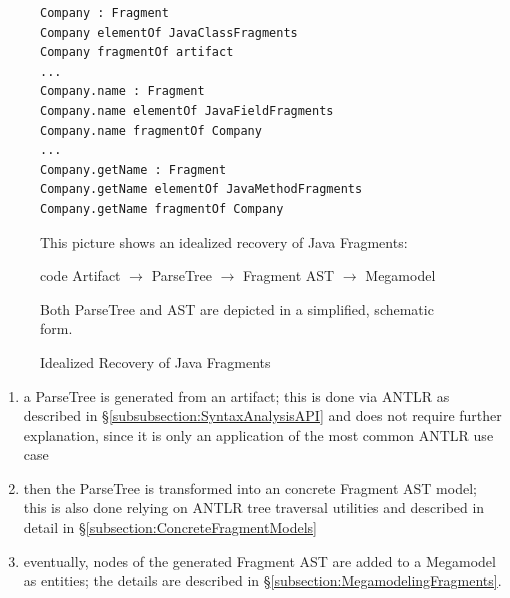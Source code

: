 \begin{figure}[h!]
\begin{center}
\begin{minipage}{0.5\textwidth}
\begin{lstlisting}[numbers=none]
Company : Fragment
Company elementOf JavaClassFragments
Company fragmentOf artifact
...
Company.name : Fragment
Company.name elementOf JavaFieldFragments
Company.name fragmentOf Company
...
Company.getName : Fragment
Company.getName elementOf JavaMethodFragments
Company.getName fragmentOf Company
\end{lstlisting}
\end{minipage}
\end{center}
{
\scriptsize
This picture shows an idealized recovery of \gls{Java} \glspl{Fragment}:
\begin{center}
code \gls{Artifact}
$\rightarrow$
\gls{ParseTree}
$\rightarrow$
\gls{Fragment} \gls{AST}
$\rightarrow$
\gls{Megamodel}
\end{center} 
Both \gls{ParseTree} and \gls{AST} are depicted in a simplified, schematic form.
}
\caption{Idealized Recovery of Java Fragments}
\label{figure:IdealizedRecoveryOfJavaFragments}
\end{figure}
\begin{enumerate}
\item
a \gls{ParseTree} is generated from an artifact; this is done via \gls{ANTLR} as described in §\ref{subsubsection:SyntaxAnalysisAPI} and does not require further explanation, since it is only an application of the most common \gls{ANTLR} use case
\item
then the \gls{ParseTree} is transformed into an concrete \gls{Fragment} \gls{AST} model; this is also done relying on \gls{ANTLR} tree traversal utilities and described in detail in §\ref{subsection:ConcreteFragmentModels}
\item
eventually, nodes of the generated \gls{Fragment} \gls{AST} are added to a \gls{Megamodel} as entities; the details are described in §\ref{subsection:MegamodelingFragments}.
\end{enumerate}



